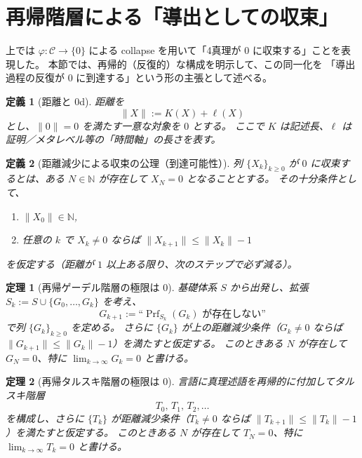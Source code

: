 \documentclass[12pt,a4paper]{article}
\newcommand{\dfix}{\mathfrak{0}}          %
\newcommand{\phiMap}{\varphi}            %
\newtheorem{definition}{定義}[section]
\newtheorem{theorem}{定理}[section]
\begin{document}
\section{再帰階層による「導出としての収束」}

上では $\phiMap:\mathcal{C}\to\{\dfix\}$ による collapse を用いて「4真理が $\dfix$ に収束する」ことを表現した。
本節では、再帰的（反復的）な構成を明示して、この同一化を
「導出過程の反復が $\dfix$ に到達する」という形の主張として述べる。

\begin{definition}[距離と 0d]
距離を
\[
  \|X\|:=K(X)+\ell(X)
\]
とし、$\|\dfix\|=0$ を満たす一意な対象を $\dfix$ とする。
ここで $K$ は記述長、$\ell$ は証明／メタレベル等の「時間軸」の長さを表す。
\end{definition}

\begin{definition}[距離減少による収束の公理（到達可能性）]
列 $\{X_k\}_{k\ge0}$ が $\dfix$ に\emph{収束する}とは、ある $N\in\mathbb{N}$ が存在して $X_N=\dfix$ となることとする。
その十分条件として、
\begin{enumerate}
  \item $\|X_0\|\in\mathbb{N}$,
  \item 任意の $k$ で $X_k\neq\dfix$ ならば $\|X_{k+1}\|\le \|X_k\|-1$
\end{enumerate}
を仮定する（距離が $1$ 以上ある限り、次のステップで必ず減る）。
\end{definition}

\begin{theorem}[再帰ゲーデル階層の極限は $\dfix$]
基礎体系 $S$ から出発し、拡張 $S_k:=S\cup\{G_0,\dots,G_k\}$ を考え、
\[
  G_{k+1}:=\text{``}\operatorname{Prf}_{S_k}(G_k)\text{ が存在しない''}
\]
で列 $\{G_k\}_{k\ge0}$ を定める。
さらに $\{G_k\}$ が上の距離減少条件（$G_k\neq\dfix$ ならば $\|G_{k+1}\|\le \|G_k\|-1$）を満たすと仮定する。
このときある $N$ が存在して $G_N=\dfix$、特に $\lim_{k\to\infty}G_k=\dfix$ と書ける。
\end{theorem}

\begin{theorem}[再帰タルスキ階層の極限は $\dfix$]
言語に真理述語を再帰的に付加してタルスキ階層
\[
  T_0,\,T_1,\,T_2,\dots
\]
を構成し、さらに $\{T_k\}$ が距離減少条件（$T_k\neq\dfix$ ならば $\|T_{k+1}\|\le \|T_k\|-1$）を満たすと仮定する。
このときある $N$ が存在して $T_N=\dfix$、特に $\lim_{k\to\infty}T_k=\dfix$ と書ける。
\end{theorem}
\end{document}
